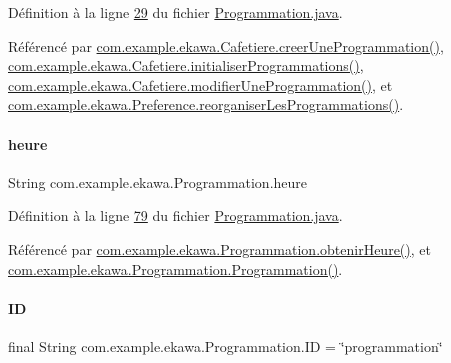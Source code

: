 Définition à la ligne \hyperlink{_programmation_8java_source_l00029}{29} du fichier \hyperlink{_programmation_8java_source}{Programmation.\+java}.



Référencé par \hyperlink{_cafetiere_8java_source_l00731}{com.\+example.\+ekawa.\+Cafetiere.\+creer\+Une\+Programmation()}, \hyperlink{_cafetiere_8java_source_l00692}{com.\+example.\+ekawa.\+Cafetiere.\+initialiser\+Programmations()}, \hyperlink{_cafetiere_8java_source_l00775}{com.\+example.\+ekawa.\+Cafetiere.\+modifier\+Une\+Programmation()}, et \hyperlink{_preference_8java_source_l00157}{com.\+example.\+ekawa.\+Preference.\+reorganiser\+Les\+Programmations()}.

\mbox{\label{classcom_1_1example_1_1ekawa_1_1_programmation_abfff674f6cd5f76ea4b8c37e8c558ffa}} 
\paragraph{\texorpdfstring{heure}{heure}}
{\footnotesize\ttfamily String com.\+example.\+ekawa.\+Programmation.\+heure\hspace{0.3cm}{\ttfamily [private]}}



Définition à la ligne \hyperlink{_programmation_8java_source_l00079}{79} du fichier \hyperlink{_programmation_8java_source}{Programmation.\+java}.



Référencé par \hyperlink{_programmation_8java_source_l00151}{com.\+example.\+ekawa.\+Programmation.\+obtenir\+Heure()}, et \hyperlink{_programmation_8java_source_l00091}{com.\+example.\+ekawa.\+Programmation.\+Programmation()}.

\mbox{\label{classcom_1_1example_1_1ekawa_1_1_programmation_ae0552520e4ca9dc152bb503a7a00bf3a}} 
\paragraph{\texorpdfstring{ID}{ID}}
{\footnotesize\ttfamily final String com.\+example.\+ekawa.\+Programmation.\+ID = \char`\"{}programmation\char`\"{}\hspace{0.3cm}{\ttfamily [static]}}



